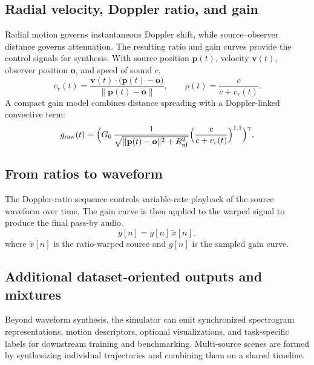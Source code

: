 \documentclass{article}
\begin{document}
\subsection{Radial velocity, Doppler ratio, and gain}
\label{sec:sim-ratio-gain}

Radial motion governs instantaneous Doppler shift, while source--observer distance governs attenuation. The resulting ratio and gain curves provide the control signals for synthesis.
With source position \(\mathbf{p}(t)\), velocity \(\mathbf{v}(t)\), observer position \(\mathbf{o}\), and speed of sound \(c\),
\begin{equation}
  v_r(t)=\frac{\mathbf{v}(t)\cdot\bigl(\mathbf{p}(t)-\mathbf{o}\bigr)}{\bigl\|\mathbf{p}(t)-\mathbf{o}\bigr\|},
  \qquad
  \rho(t)=\frac{c}{c+v_r(t)} .
\end{equation}
A compact gain model combines distance spreading with a Doppler-linked convective term:
\begin{equation}
  g_{\mathrm{raw}}(t)=\Bigl(G_0\,
  \frac{1}{\sqrt{\|\mathbf{p}(t)-\mathbf{o}\|^2+R_{\mathrm{nf}}^2}}
  \Bigl(\frac{c}{c+v_r(t)}\Bigr)^{1.1}\Bigr)^{\gamma}.
\end{equation}

\subsection{From ratios to waveform}
\label{sec:sim-warp}

The Doppler-ratio sequence controls variable-rate playback of the source waveform over time. The gain curve is then applied to the warped signal to produce the final pass-by audio.
\begin{equation}
  y[n]=g[n]\,\tilde{x}[n],
\end{equation}
where \(\tilde{x}[n]\) is the ratio-warped source and \(g[n]\) is the sampled gain curve.

\subsection{Additional dataset-oriented outputs and mixtures}
\label{sec:sim-outputs}

Beyond waveform synthesis, the simulator can emit synchronized spectrogram representations, motion descriptors, optional visualizations, and task-specific labels for downstream training and benchmarking. Multi-source scenes are formed by synthesizing individual trajectories and combining them on a shared timeline.
\end{document}
